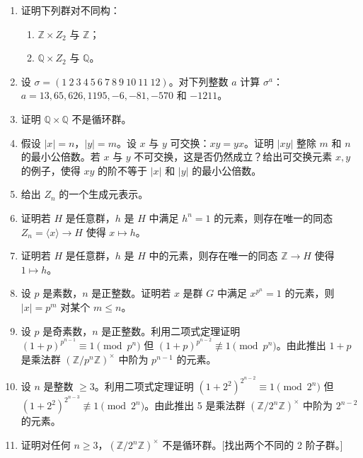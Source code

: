 \begin{enumerate}[label=\arabic*]
\item 证明下列群对不同构：
\begin{enumerate}[label=(\alph*)]
\item \(\mathbb{Z} \times Z_2\) 与 \(\mathbb{Z}\)；
\item \(\mathbb{Q} \times Z_2\) 与 \(\mathbb{Q}\)。
\end{enumerate}

\item 设 \(\sigma = (1\ 2\ 3\ 4\ 5\ 6\ 7\ 8\ 9\ 10\ 11\ 12)\)。对下列整数 \(a\) 计算 \(\sigma^a\)：\(a = 13, 65, 626, 1195, -6, -81, -570\) 和 \(-1211\)。

\item 证明 \(\mathbb{Q} \times \mathbb{Q}\) 不是循环群。

\item 假设 \(|x| = n\)，\(|y| = m\)。设 \(x\) 与 \(y\) 可交换：\(xy = yx\)。证明 \(|xy|\) 整除 \(m\) 和 \(n\) 的最小公倍数。若 \(x\) 与 \(y\) 不可交换，这是否仍然成立？给出可交换元素 \(x, y\) 的例子，使得 \(xy\) 的阶不等于 \(|x|\) 和 \(|y|\) 的最小公倍数。

\item 给出 \(Z_n\) 的一个生成元表示。

\item 证明若 \(H\) 是任意群，\(h\) 是 \(H\) 中满足 \(h^n = 1\) 的元素，则存在唯一的同态 \(Z_n = \langle x \rangle \to H\) 使得 \(x \mapsto h\)。

\item 证明若 \(H\) 是任意群，\(h\) 是 \(H\) 中的元素，则存在唯一的同态 \(\mathbb{Z} \to H\) 使得 \(1 \mapsto h\)。

\item 设 \(p\) 是素数，\(n\) 是正整数。证明若 \(x\) 是群 \(G\) 中满足 \(x^{p^n} = 1\) 的元素，则 \(|x| = p^m\) 对某个 \(m \leq n\)。

\item 设 \(p\) 是奇素数，\(n\) 是正整数。利用二项式定理证明 \((1+p)^{p^{n-1}} \equiv 1 \pmod{p^n}\) 但 \((1+p)^{p^{n-2}} \not\equiv 1 \pmod{p^n}\)。由此推出 \(1+p\) 是乘法群 \((\mathbb{Z}/p^n\mathbb{Z})^\times\) 中阶为 \(p^{n-1}\) 的元素。

\item 设 \(n\) 是整数 \(\geq 3\)。利用二项式定理证明 \((1+2^2)^{2^{n-2}} \equiv 1 \pmod{2^n}\) 但 \((1+2^2)^{2^{n-3}} \not\equiv 1 \pmod{2^n}\)。由此推出 5 是乘法群 \((\mathbb{Z}/2^n\mathbb{Z})^\times\) 中阶为 \(2^{n-2}\) 的元素。

\item 证明对任何 \(n \geq 3\)，\((\mathbb{Z}/2^n\mathbb{Z})^\times\) 不是循环群。[找出两个不同的 2 阶子群。]


\end{enumerate}
